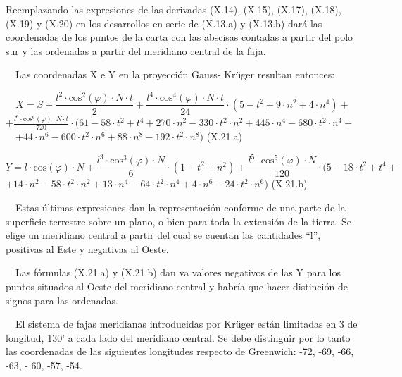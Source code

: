 \documentclass{tufte-book}
\begin{document}
Reemplazando las expresiones de las derivadas (X.14), (X.15), (X.17),
(X.18), (X.19) y (X.20) en los desarrollos en serie de (X.13.a) y
(X.13.b) dará las coordenadas de los puntos de la carta con las
abscisas contadas a partir del polo sur y las ordenadas a partir del
meridiano central de la faja.

\ \ Las coordenadas X e Y en la proyección Gauss- Kr\"uger resultan
entonces:

\begin{equation*}
{X=S+\frac{l^{{2}}\cdot \text{cos}^{{2}}\left(\varphi \right)\cdot
N\cdot t}{2}+\frac{l^{{4}}\cdot \text{cos}^{{4}}\left(\varphi
\right)\cdot N\cdot t}{\text{24}}\cdot \left(5-t^{{2}}+9\cdot
n^{{2}}+4\cdot n^{{4}}\right)+}
\end{equation*}
 ${+{\frac{l^{{6}}\cdot \text{cos}^{{6}}\left(\varphi \right)\cdot
N\cdot t}{\text{720}}}\cdot (\text{61}-\text{58}\cdot
t^{{2}}+t^{{4}}+\text{270}\cdot n^{{2}}-\text{330}\cdot t^{{2}}\cdot
n^{{2}}+\text{445}\cdot n^{{4}}-\text{680}\cdot t^{{2}}\cdot
n^{{4}}+}$\ \  ${+\text{44}\cdot n^{{6}}-\text{600}\cdot t^{{2}}\cdot
n^{{6}}+\text{88}\cdot n^{{8}}-\text{192}\cdot t^{{2}}\cdot n^{{8}})}$ 
(X.21.a)

\begin{equation*}
{Y=l\cdot \text{cos}\left(\varphi \right)\cdot N+\frac{l^{{3}}\cdot
\text{cos}^{{3}}\left(\varphi \right)\cdot N}{6}\cdot
\left(1-t^{{2}}+n^{{2}}\right)+\frac{l^{{5}}\cdot
\text{cos}^{{5}}\left(\varphi \right)\cdot N}{\text{120}}\cdot
(5-\text{18}\cdot t^{{2}}+t^{{4}}+}
\end{equation*}
 ${+\text{14}\cdot n^{{2}}-\text{58}\cdot t^{{2}}\cdot
n^{{2}}+\text{13}\cdot n^{{4}}-\text{64}\cdot t^{{2}}\cdot
n^{{4}}+4\cdot n^{{6}}-\text{24}\cdot t^{{2}}\cdot n^{{6}})}$  (X.21.b)

\ \ Estas últimas expresiones dan la representación conforme de una
parte de la superficie terrestre sobre un plano, o bien para toda la
extensión de la tierra. Se elige un meridiano central a partir del
cual se cuentan las cantidades
{\textquotedblleft}l{\textquotedblright}, positivas al Este y negativas
al Oeste.

\ \ Las fórmulas (X.21.a) y (X.21.b) dan va valores negativos de las Y
para los puntos situados al Oeste del meridiano central y habría que
hacer distinción de signos para las ordenadas.

\ \ El sistema de fajas meridianas introducidas por Kr\"uger están
limitadas en 3{\textordfeminine} de longitud,
1{\textordfeminine}30{\textquoteright} a cada lado del meridiano
central. Se debe distinguir por lo tanto las coordenadas de las
siguientes longitudes respecto de Greenwich: -72{\textordmasculine},
-69{\textordmasculine}, -66{\textordmasculine}, -63{\textordmasculine},
- 60{\textordmasculine}, -57{\textordmasculine},
-54{\textordmasculine}.
\end{document}
